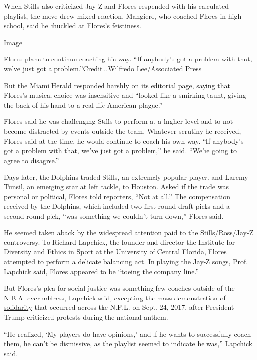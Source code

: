 When Stills also criticized Jay-Z and Flores responded with his
calculated playlist, the move drew mixed reaction. Mangiero, who coached
Flores in high school, said he chuckled at Flores's feistiness.

Image

Flores plans to continue coaching his way. ``If anybody's got a problem
with that, we've just got a problem.''Credit...Wilfredo Lee/Associated
Press

But the
\href{https://www.miamiherald.com/opinion/editorials/article234224472.html}{Miami
Herald responded harshly on its editorial page}, saying that Flores's
musical choice was insensitive and ``looked like a smirking taunt,
giving the back of his hand to a real-life American plague.''

Flores said he was challenging Stills to perform at a higher level and
to not become distracted by events outside the team. Whatever scrutiny
he received, Flores said at the time, he would continue to coach his own
way. ``If anybody's got a problem with that, we've just got a problem,''
he said. ``We're going to agree to disagree.''

Days later, the Dolphins traded Stills, an extremely popular player, and
Laremy Tunsil, an emerging star at left tackle, to Houston. Asked if the
trade was personal or political, Flores told reporters, ``Not at all.''
The compensation received by the Dolphins, which included two
first-round draft picks and a second-round pick, ``was something we
couldn't turn down,'' Flores said.

He seemed taken aback by the widespread attention paid to the
Stills/Ross/Jay-Z controversy. To Richard Lapchick, the founder and
director the Institute for Diversity and Ethics in Sport at the
University of Central Florida, Flores attempted to perform a delicate
balancing act. In playing the Jay-Z songs, Prof. Lapchick said, Flores
appeared to be ``toeing the company line.''

But Flores's plea for social justice was something few coaches outside
of the N.B.A. ever address, Lapchick said, excepting the
\href{https://www.nytimes3xbfgragh.onion/2017/09/24/sports/nfl-trump-anthem-protests.html}{mass
demonstration of solidarity} that occurred across the N.F.L. on Sept.
24, 2017, after President Trump criticized protests during the national
anthem.

``He realized, `My players do have opinions,' and if he wants to
successfully coach them, he can't be dismissive, as the playlist seemed
to indicate he was,'' Lapchick said.

